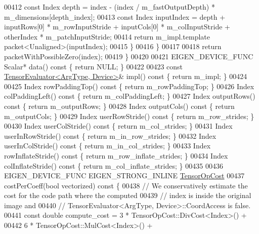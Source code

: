 \begin{DoxyCode}
00412         \textcolor{keyword}{const} Index depth = index - (index / m\_fastOutputDepth) * m\_dimensions[depth\_index];
00413         \textcolor{keyword}{const} Index inputIndex = depth + inputRows[0] * m\_rowInputStride + inputCols[0] * m\_colInputStride 
      + otherIndex * m\_patchInputStride;
00414         \textcolor{keywordflow}{return} m\_impl.template packet<Unaligned>(inputIndex);
00415       \}
00416     \}
00417 
00418     \textcolor{keywordflow}{return} packetWithPossibleZero(index);
00419   \}
00420 
00421   EIGEN\_DEVICE\_FUNC Scalar* data()\textcolor{keyword}{ const }\{ \textcolor{keywordflow}{return} NULL; \}
00422 
00423   \textcolor{keyword}{const} \hyperlink{struct_eigen_1_1_tensor_evaluator}{TensorEvaluator<ArgType, Device>}& impl()\textcolor{keyword}{ const }\{ \textcolor{keywordflow}{return} m\_impl; \}
00424 
00425   Index rowPaddingTop()\textcolor{keyword}{ const }\{ \textcolor{keywordflow}{return} m\_rowPaddingTop; \}
00426   Index colPaddingLeft()\textcolor{keyword}{ const }\{ \textcolor{keywordflow}{return} m\_colPaddingLeft; \}
00427   Index outputRows()\textcolor{keyword}{ const }\{ \textcolor{keywordflow}{return} m\_outputRows; \}
00428   Index outputCols()\textcolor{keyword}{ const }\{ \textcolor{keywordflow}{return} m\_outputCols; \}
00429   Index userRowStride()\textcolor{keyword}{ const }\{ \textcolor{keywordflow}{return} m\_row\_strides; \}
00430   Index userColStride()\textcolor{keyword}{ const }\{ \textcolor{keywordflow}{return} m\_col\_strides; \}
00431   Index userInRowStride()\textcolor{keyword}{ const }\{ \textcolor{keywordflow}{return} m\_in\_row\_strides; \}
00432   Index userInColStride()\textcolor{keyword}{ const }\{ \textcolor{keywordflow}{return} m\_in\_col\_strides; \}
00433   Index rowInflateStride()\textcolor{keyword}{ const }\{ \textcolor{keywordflow}{return} m\_row\_inflate\_strides; \}
00434   Index colInflateStride()\textcolor{keyword}{ const }\{ \textcolor{keywordflow}{return} m\_col\_inflate\_strides; \}
00435 
00436   EIGEN\_DEVICE\_FUNC EIGEN\_STRONG\_INLINE \hyperlink{class_eigen_1_1_tensor_op_cost}{TensorOpCost}
00437   costPerCoeff(\textcolor{keywordtype}{bool} vectorized)\textcolor{keyword}{ const }\{
00438     \textcolor{comment}{// We conservatively estimate the cost for the code path where the computed}
00439     \textcolor{comment}{// index is inside the original image and}
00440     \textcolor{comment}{// TensorEvaluator<ArgType, Device>::CoordAccess is false.}
00441     \textcolor{keyword}{const} \textcolor{keywordtype}{double} compute\_cost = 3 * TensorOpCost::DivCost<Index>() +
00442                                 6 * TensorOpCost::MulCost<Index>() +

\end{DoxyCode}
